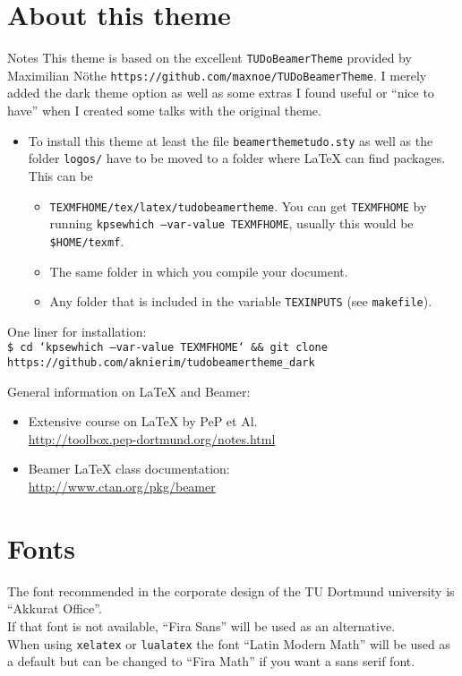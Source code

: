 \section{About this theme}
\begin{frame}{Notes}
  This theme is based on the excellent \texttt{TUDoBeamerTheme} provided by Maximilian Nöthe \texttt{https://github.com/maxnoe/TUDoBeamerTheme}.
  I merely added the dark theme option as well as some extras I found useful or \enquote{nice to have} when I created some talks with the original theme.
  \begin{itemize}
    \item To install this theme at least the file \texttt{beamerthemetudo.sty} as well as the folder \texttt{logos/} have to be moved to a folder where \LaTeX{} can find packages.
      This can be
      \begin{itemize}
        \item \texttt{TEXMFHOME/tex/latex/tudobeamertheme}. You can get \texttt{TEXMFHOME} by running \texttt{kpsewhich --var-value TEXMFHOME}, usually this would be \texttt{\$HOME/texmf}.
        \item The same folder in which you compile your document.
        \item Any folder that is included in the variable \texttt{TEXINPUTS} (see \texttt{makefile}).
      \end{itemize}
  \end{itemize}

  One liner for installation:\\
  \texttt{\footnotesize\$ cd `kpsewhich --var-value TEXMFHOME` \&\& git clone https://github.com/aknierim/tudobeamertheme\_dark}

  \medskip
  General information on \LaTeX{} and Beamer:
  \begin{itemize}
    \item Extensive course on \LaTeX{} by PeP et Al. \\
      \url{http://toolbox.pep-dortmund.org/notes.html}
    \item Beamer \LaTeX{} class documentation:\\
      \url{http://www.ctan.org/pkg/beamer}
  \end{itemize}
\end{frame}


\section{Fonts}
\begin{frame}
  The font recommended in the corporate design of the TU Dortmund university
  is \enquote{Akkurat Office}.\\
  \bigskip
  If that font is not available, \enquote{Fira Sans} will be used as an alternative.\\
  \bigskip
  When using \texttt{xelatex} or \texttt{lualatex} the font \enquote{Latin Modern Math}
  will be used as a default but can be changed to \enquote{Fira Math} if you want a
  sans serif font.
\end{frame}






